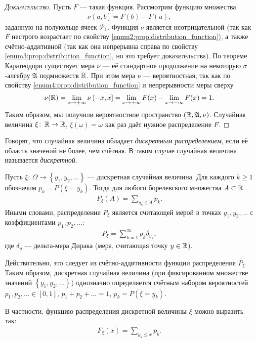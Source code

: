 \documentclass[../main.tex]{subfiles}
\begin{document}
\begin{proof}[\normalfont\textsc{Доказательство}]
 Пусть $F$ --- такая функция. Рассмотрим функцию множества
 \begin{align*}
  \nu \left(a, b\right] = F(b) - F(a),
 \end{align*} заданную на полукольце ячеек $ \mathcal P_1 $. Функция $ \nu $ является неотрицательной (так как $ F $ нестрого возрастает по свойству \ref{enum2:prop:distribution_function}), а также счётно-аддитивной (так как она непрерывна справа по свойству \ref{enum3:prop:distribution_function}, но это требует доказательства). По теореме Каратеодори существует мера $ \nu $ --- её стандартное продолжение на некоторую $ \sigma $-алгебру $ \mathfrak A $ подмножеств $ \mathbb{R} $. При этом мера $ \nu $ --- вероятностная, так как по свойству \ref{enum4:prop:distribution_function} и непрерывности меры сверху
 \begin{align*}
  \nu(\mathbb{R}) = \lim_{x \to +\infty} \nu \left(-x, x\right] = \lim_{x \to +\infty} F(x) - \lim_{x \to -\infty} F(x) = 1. 
 \end{align*} Таким образом, мы получили вероятностное пространство $ (\mathbb{R},\mathfrak A, \nu) $. Случайная величина $ \xi \colon\, \mathbb{R} \to \mathbb{R} $, $ \xi(\omega) = \omega $ как раз даёт нужное распределение $ F $.
\end{proof}

\begin{df}
 Говорят, что случайная величина обладает \textit{дискретным распределением}, если её область значений не более, чем счётная. В таком случае случайная величина называется \textit{дискретной}.
\end{df}
\begin{remrk}
 Пусть $\xi \colon\, \Omega \to \left\{ y_1, y_2, \ldots \right\}$ --- дискретная случайная величина. Для каждого $ k \geqslant 1 $ обозначим $ p_k = P(\xi = y_k) $. Тогда для любого борелевского множества $ A \subset \mathbb{R} $
 \begin{align*}
  P_{\xi}(A) = \sum_{y_k \in A}  p_k.
 \end{align*} Иными словами, распределение $ P_\xi $ является считающей мерой в точках  $ y_1, y_2, \ldots $  с коэффициентами $ p_1, p_2, \ldots $:
 \begin{align*}
  P_\xi = \sum_{k=1}^{\infty} p_k \delta_{ y_k },
 \end{align*} где $ \delta_{y } $ --- дельта-мера Дирака (мера, считающая точку $ y \in \mathbb{R} $).

 Действительно, это следует из счётно-аддитивности функции распределения $ P_{\xi} $. Таким образом, дискретная случайная величина (при фиксированном множестве значений $ \left\{ y_1, y_2, \ldots \right\} $) однозначно определяется счётным набором вероятностей $ p_1, p_2, \ldots \in [0,1] $, $ p_1 + p_2 + \ldots = 1 $, $ p_k = P(\xi = y_k) $.

 В частности, функцию распределения дискретной величины $ \xi $ можно выразить так:
 \begin{align*}
  F_{\xi}(x) = \sum_{y_k \leqslant x} p_k.
 \end{align*} 
\end{remrk}
\end{document}
